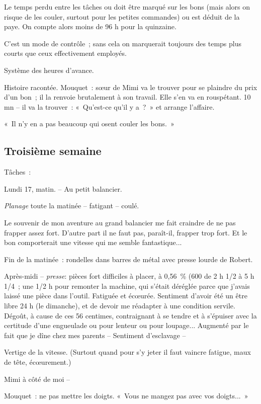 \documentclass[french,twoside]{book} %
\begin{document}
Le temps perdu entre les tâches ou doit être marqué sur les bons (mais alors on risque de les couler, surtout pour les petites commandes) ou est déduit de la paye. On compte alors moins de 96 h pour la quinzaine.\par
C'est un mode de contrôle ; sans cela on marquerait toujours des temps plus courts que ceux effectivement employés.\par
Système des heures d'avance.\par
Histoire racontée. Mouquet : sœur de Mimi va le trouver pour se plaindre du prix d'un bon ; il la renvoie brutalement à son travail. Elle s'en va en rouspétant. 10 mn – il va la trouver : « Qu'est-ce qu'il y a ? » et arrange l'affaire.\par
« Il n'y en a pas beaucoup qui osent couler les bons. »
\subsection[Troisième semaine]{Troisième semaine}
\noindent \par
Tâches :\par
Lundi 17, matin. – Au petit balancier.\par
{\itshape Planage} toute la matinée – fatigant – coulé.\par
Le souvenir de mon aventure au grand balancier me fait craindre de ne pas frapper assez fort. D'autre part il ne faut pas, paraît-il, frapper trop fort. Et le bon comporterait une vitesse qui me semble fantastique...\par
Fin de la matinée : rondelles dans barres de métal avec presse lourde de Robert.\par
Après-midi – {\itshape presse}: pièces fort difficiles à placer, à 0,56 \% (600 de 2 h 1/2 à 5 h 1/4 ; une 1/2 h pour remonter la machine, qui s'était déréglée parce que j'avais laissé une pièce dans l'outil. Fatiguée et écœurée. Sentiment d'avoir été un être libre 24 h (le dimanche), et de devoir me réadapter à une condition servile. Dégoût, à cause de ces 56 centimes, contraignant à se tendre et à s'épuiser avec la certitude d'une engueulade ou pour lenteur ou pour loupage... Augmenté par le fait que je dîne chez mes parents – Sentiment d'esclavage –\par
Vertige de la vitesse. (Surtout quand pour s'y jeter il faut vaincre fatigue, maux de tête, écœurement.)\par
Mimi à côté de moi –\par
Mouquet : ne pas mettre les doigts. « Vous ne mangez pas avec vos doigts... »\par
\end{document}
